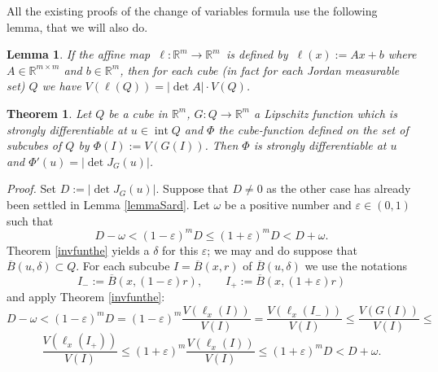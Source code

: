 \documentclass{article}
\newcommand{\proof}[1]{\textit{Proof. }#1}
\newtheorem{theorem}{Theorem}
\newtheorem{lemma}{Lemma}
\newcommand{\ir}{\mathop{\mathrm{int}}\nolimits}
\newcommand{\R}{\ensuremath{\mathbb R}}
\newcommand{\ee}{\varepsilon}
\newcommand{\ol}{\overline}
\begin{document}
All the existing proofs of the change of variables formula use the
following lemma, that we will also do.

\begin{lemma}
If the affine map $\ \ell:\R^m\to\R^m\,$ is defined by $\
\ell(x):=Ax+b$ where $A\in\R^{m\times m}$ and $b\in\R^m$, then for
each cube (in fact for each Jordan measurable set) $Q$ we have
$V(\ell(Q))=|\det A|\cdot V(Q)$.
\end{lemma}

\begin{theorem}\label{dibility}
Let $Q$ be a cube in $\R^m$, $G:Q\to\R^m$ a Lipschitz function
which is strongly differentiable at
$u\in\ir Q$ and $\Phi$ the cube-function defined on the set of
subcubes of $Q$ by $\Phi(I):=V(G(I))$.
Then $\Phi$ is strongly differentiable at $u$ and $\Phi'(u)=|\det J_G(u)|$.
\end{theorem}

\proof{
Set $D:=|\det J_G(u)|$. Suppose that $ D\neq0$ as the
other case has already been settled in Lemma \ref{lemmaSard}.
Let $\omega$ be a positive number and $\varepsilon\in(0,1)$ such that
\[D-\omega<(1-\ee)^mD\le(1+\ee)^mD<D+\omega.\]
Theorem \ref{invfunthe} yields a $\delta$ for this $\ee$; we may
and do suppose that $\ol{B}(u,\delta)\subset Q$. For each subcube
$I=\ol{B}(x,r)$ of $\ol{B}(u,\delta)$ we use the notations
\[I_-:=\ol{B}(x,(1-\ee)r),\qquad I_+:=\ol{B}(x,(1+\ee)r)\]
and apply Theorem \ref{invfunthe}:
\[D-\omega<(1-\ee)^mD=(1-\ee)^m\frac{V(\ell_x(I))}{V(I)}=
\frac{V(\ell_x(I_-))}{V(I)}\le\frac{V(G(I))}{V(I)}\le\]
\[\frac{V(\ell_x(I_+))}{V(I)}\le(1+\ee)^m\frac{V(\ell_x(I))}{V(I)}\le
(1+\ee)^mD<D+\omega.\]%
}%
\end{document}
